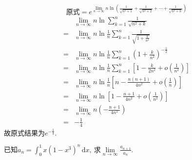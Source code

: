 	\begin{solution}
		$$\text{原式}=e^{\lim\limits_{n\rightarrow\infty}n\ln\left(\frac{1}{\sqrt{n^2+1}}+\frac{1}{\sqrt{n^2+2}}+\cdots+\frac{1}{\sqrt{n^2+n}}\right)}$$
		\begin{align*}
			&\lim\limits_{n\rightarrow\infty}n\ln\sum\limits_{k=1}^{n}\frac{1}{\sqrt{n^2+k}}\\
			=&\lim\limits_{n\rightarrow\infty}n\ln\frac{1}{n}\sum\limits_{k=1}^{n}\frac{1}{\sqrt{1+\frac{k}{n^2}}}\\
			=&\lim\limits_{n\rightarrow\infty}n\ln\frac{1}{n}\sum\limits_{k=1}^{n}\left(1+\frac{k}{n^2}\right)^{-\frac{1}{2}}\\
			=&\lim\limits_{n\rightarrow\infty}n\ln\frac{1}{n}\sum\limits_{k=1}^{n}\left[1-\frac{k}{2n^2}+o\left(\frac{1}{n^2}\right)\right]\\
			=&\lim\limits_{n\rightarrow\infty}n\ln\frac{1}{n}\left[n-\frac{n(n+1)}{4n^2}+o\left(\frac{1}{n}\right)\right]\\
			=&\lim\limits_{n\rightarrow\infty}n\ln\left[1-\frac{n+1}{4n^2}+o\left(\frac{1}{n^2}\right)\right]\\
			=&\lim\limits_{n\rightarrow\infty}n\left(-\frac{n+1}{4n^2}\right)\\
			=&-\frac{1}{4}
		\end{align*}
		故原式结果为$e^{-\frac{1}{4}}.$
	\end{solution}
	\newpage
	\begin{problem}
		已知$a_n=\int_{0}^{1}x(1-x^3)^n\,\text{d}x,\ $求$\lim\limits_{n\rightarrow\infty}\frac{a_{n+1}}{a_n}.$
	\end{problem}
	
